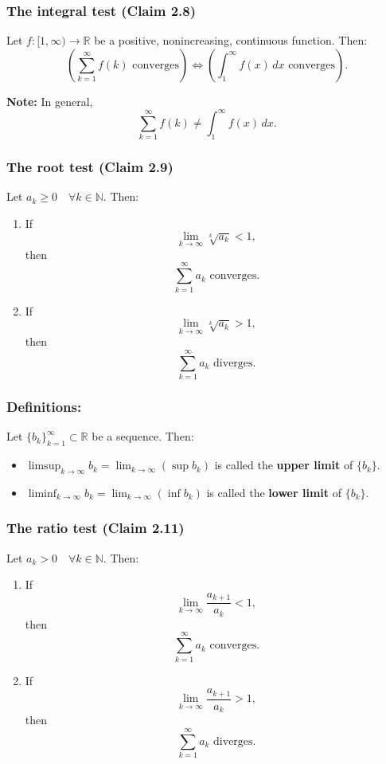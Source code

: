 \subsubsection{The integral test (Claim 2.8)}


Let $f : [1, \infty) \to \mathbb{R}$ be a positive, nonincreasing, continuous function. Then:
\[
    \left( \sum_{k=1}^\infty f(k) \text{ converges} \right)
    \iff
    \left( \int_1^\infty f(x) \, dx \text{ converges} \right).
\]

\textbf{Note:} In general,
\[
    \sum_{k=1}^\infty f(k) \neq \int_1^\infty f(x) \, dx.
\]

\subsubsection{The root test (Claim 2.9)}

Let $a_k \geq 0 \quad \forall k \in \mathbb{N}$. Then:
\begin{enumerate}[label=(\arabic*)]
    \item If
    \[
        \lim_{k \to \infty} \sqrt[k]{a_k} < 1,
    \]
    then
    \[
        \sum_{k=1}^\infty a_k \text{ converges.}
    \]

    \item If
    \[
        \lim_{k \to \infty} \sqrt[k]{a_k} > 1,
    \]
    then
    \[
        \sum_{k=1}^\infty a_k \text{ diverges.}
    \]
\end{enumerate}


\subsubsection*{Definitions:}
Let $\{b_k\}_{k=1}^\infty \subset \mathbb{R}$ be a sequence. Then:
\begin{itemize}
    \item $\limsup_{k \to \infty} b_k = \lim_{k \to \infty} (\sup b_k)$ is called the \textbf{upper limit} of $\{b_k\}$.
    \item $\liminf_{k \to \infty} b_k = \lim_{k \to \infty} (\inf b_k)$ is called the \textbf{lower limit} of $\{b_k\}$.
\end{itemize}

\subsubsection{The ratio test (Claim 2.11)}


Let $a_k > 0 \quad \forall k \in \mathbb{N}$. Then:
\begin{enumerate}[label=(\arabic*)]
    \item If
    \[
        \lim_{k \to \infty} \frac{a_{k+1}}{a_k} < 1,
    \]
    then
    \[
        \sum_{k=1}^\infty a_k \text{ converges.}
    \]

    \item If
    \[
        \lim_{k \to \infty} \frac{a_{k+1}}{a_k} > 1,
    \]
    then
    \[
        \sum_{k=1}^\infty a_k \text{ diverges.}
    \]
\end{enumerate}

